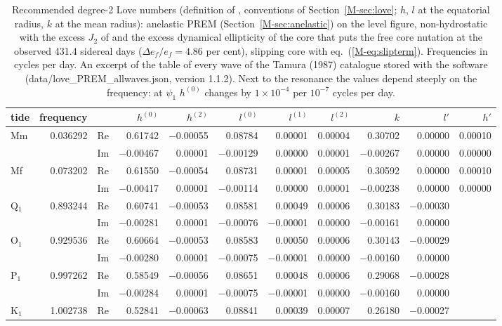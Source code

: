 \begin{table}
\caption{Recommended degree-2 Love numbers (definition of \citet{mathews1995}, conventions of Section~\ref{M-sec:love}; $h$, $l$ at the equatorial radius, $k$ at the mean radius): anelastic PREM (Section~\ref{M-sec:anelastic}) on the level figure, non-hydrostatic with the excess $J_2$ of \citet{chambat2010} and the excess dynamical ellipticity of the core that puts the free core nutation at the observed 431.4 sidereal days ($\Delta e_f/e_f=4.86$ per cent), slipping core with eq.~(\ref{M-eq:slipterm}). Frequencies in cycles per day. An excerpt of the table of every wave of the Tamura (1987) catalogue stored with the software (data/love\_PREM\_allwaves.json, version 1.1.2). Next to the resonance the values depend steeply on the frequency: at $\psi_1$ $h^{(0)}$ changes by $1\times10^{-4}$ per $10^{-7}$ cycles per day.}
\label{tab:recommended}
\small
\setlength{\tabcolsep}{4pt}
\begin{tabular}{@{}lrlrrrrrrrr@{}}
\toprule
tide & frequency & & $h^{(0)}$ & $h^{(2)}$ & $l^{(0)}$ & $l^{(1)}$ & $l^{(2)}$ & $k$ & $l'$ & $h'$ \\
\midrule
Mm & 0.036292 & Re & 0.61742 & $-$0.00055 & 0.08784 & 0.00001 & 0.00004 & 0.30702 & 0.00000 & 0.00010 \\
 & & Im & $-$0.00467 & 0.00001 & $-$0.00129 & 0.00000 & 0.00001 & $-$0.00267 & 0.00000 & 0.00000 \\
Mf & 0.073202 & Re & 0.61550 & $-$0.00054 & 0.08731 & 0.00001 & 0.00005 & 0.30592 & 0.00000 & 0.00010 \\
 & & Im & $-$0.00417 & 0.00001 & $-$0.00114 & 0.00000 & 0.00001 & $-$0.00238 & 0.00000 & 0.00000 \\
\midrule
Q$_1$ & 0.893244 & Re & 0.60741 & $-$0.00053 & 0.08581 & 0.00049 & 0.00006 & 0.30183 & $-$0.00030 &  \\
 & & Im & $-$0.00281 & 0.00001 & $-$0.00076 & $-$0.00001 & 0.00000 & $-$0.00161 & 0.00000 &  \\
O$_1$ & 0.929536 & Re & 0.60664 & $-$0.00053 & 0.08583 & 0.00050 & 0.00006 & 0.30143 & $-$0.00029 &  \\
 & & Im & $-$0.00280 & 0.00001 & $-$0.00075 & $-$0.00001 & 0.00000 & $-$0.00160 & 0.00000 &  \\
P$_1$ & 0.997262 & Re & 0.58549 & $-$0.00056 & 0.08651 & 0.00048 & 0.00006 & 0.29068 & $-$0.00028 &  \\
 & & Im & $-$0.00284 & 0.00001 & $-$0.00075 & $-$0.00001 & 0.00000 & $-$0.00160 & 0.00000 &  \\
K$_1$ & 1.002738 & Re & 0.52841 & $-$0.00063 & 0.08841 & 0.00039 & 0.00007 & 0.26180 & $-$0.00027 &  \\

\end{tabular}
\end{table}
